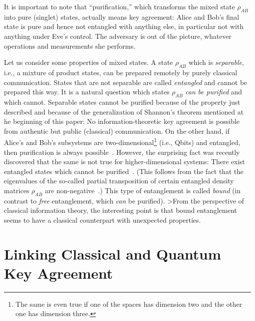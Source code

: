 \documentclass{article}
\begin{document}
It is important to note that ``purification,'' which transforms the mixed 
state $\rho_{AB}$ into pure (singlet) states, actually 
means key agreement: 
 Alice and Bob's  final state is pure and hence not entangled 
with anything else, in particular not with anything under Eve's control.
The adversary is out of the picture, whatever 
operations and measurements she performs.




Let us consider some properties of mixed states. A state $\rho_{AB}$
which is {\em separable}, i.e., a mixture of product states, can be prepared
remotely by purely classical communication.
States that are not separable are called {\em entangled\/} and cannot 
be prepared this way.
It is a natural question which states $\rho_{AB}$ {\em can be purified\/} and 
which cannot. Separable states cannot be purified because of the property 
just described and because of the generalization of Shannon's theorem
mentioned at he beginning of this paper: No information-theoretic 
key agreement is possible from authentic but public (classical)
communication. On the other hand, if Alice's
and Bob's subsystems  are two-dimensional\footnote{The same is even true
if one of the spaces has dimension two and the other one has dimension
three.} (i.e., Qbits) and entangled, 
then purification is always possible~\cite{hohoho97}. 
However, the surprising fact was 
recently discovered that the same is not true for higher-dimensional 
systems: There exist entangled states which cannot be 
purified~\cite{HorodeckiPartialTransp}. 
(This follows from the fact that the eigenvalues of the 
so-called  partial transposition of  certain entangled density 
matrices $\rho_{AB}$ are  non-negative~\cite{Peres}.)
This type of entanglement is 
called {\em bound\/} (in contrast to {\em free\/} entanglement, which 
{\em can\/} be purified).
>From the perspective of classical information theory,
the interesting point is that  
bound entanglement seems to have a classical 
counterpart with unexpected properties.








\section{Linking Classical and Quantum Key Agreement}
\label{linking}
\end{document}
